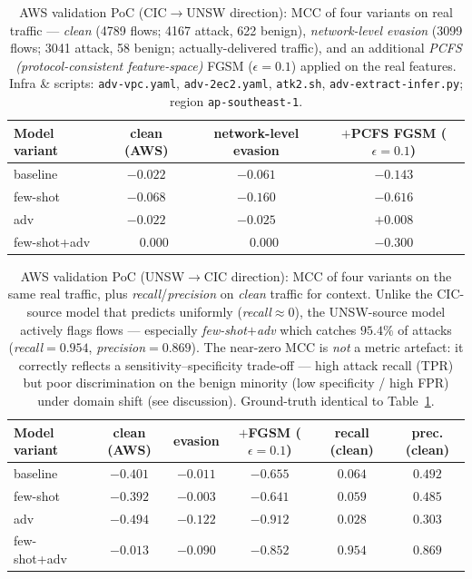 \documentclass[preprint,12pt,authoryear]{elsarticle}
\begin{document}
\begin{table}[h]
\centering
\caption{AWS validation PoC (CIC$\rightarrow$UNSW direction): MCC of four variants on
real traffic --- \emph{clean} (4789 flows; 4167 attack, 622 benign),
\emph{network-level evasion} (3099 flows; 3041 attack, 58 benign; actually-delivered
traffic), and an additional \emph{PCFS (protocol-consistent feature-space)} FGSM
($\epsilon=0.1$) applied on the real features. Infra \&
scripts: \texttt{adv-vpc.yaml}, \texttt{adv-2ec2.yaml}, \texttt{atk2.sh},
\texttt{adv-extract-infer.py}; region \texttt{ap-southeast-1}.}
\label{tab:aws}
\small
\begin{tabular}{lccc}
\toprule
Model variant & clean (AWS) & network-level evasion & $+$PCFS FGSM ($\epsilon=0.1$) \\
\midrule
baseline     & $-0.022$ & $-0.061$ & $-0.143$ \\
few-shot     & $-0.068$ & $-0.160$ & $-0.616$ \\
adv          & $-0.022$ & $-0.025$ & $+0.008$ \\
few-shot+adv & $\phantom{-}0.000$ & $\phantom{-}0.000$ & $-0.300$ \\
\bottomrule
\end{tabular}
\end{table}

\begin{table}[h]
\centering
\caption{AWS validation PoC (UNSW$\rightarrow$CIC direction): MCC of four variants on
the same real traffic, plus \emph{recall}/\emph{precision} on \emph{clean} traffic
for context. Unlike the CIC-source model that predicts uniformly (\emph{recall}$\approx
0$), the UNSW-source model actively flags flows --- especially \emph{few-shot$+$adv}
which catches $95.4\%$ of attacks (\emph{recall}$=0.954$, \emph{precision}$=0.869$).
The near-zero MCC is \emph{not} a metric artefact: it correctly reflects a
sensitivity--specificity trade-off --- high attack recall (TPR) but poor
discrimination on the benign minority (low specificity / high FPR) under domain
shift (see discussion). Ground-truth identical to Table~\ref{tab:aws}.}
\label{tab:aws_unsw}
\small
\begin{tabular}{lccccc}
\toprule
Model variant & clean (AWS) & evasion & $+$FGSM ($\epsilon{=}0.1$) & recall (clean) & prec. (clean) \\
\midrule
baseline     & $-0.401$ & $-0.011$ & $-0.655$ & $0.064$ & $0.492$ \\
few-shot     & $-0.392$ & $-0.003$ & $-0.641$ & $0.059$ & $0.485$ \\
adv          & $-0.494$ & $-0.122$ & $-0.912$ & $0.028$ & $0.303$ \\
few-shot+adv & $-0.013$ & $-0.090$ & $-0.852$ & $\mathbf{0.954}$ & $\mathbf{0.869}$ \\
\bottomrule
\end{tabular}
\end{table}
\end{document}
